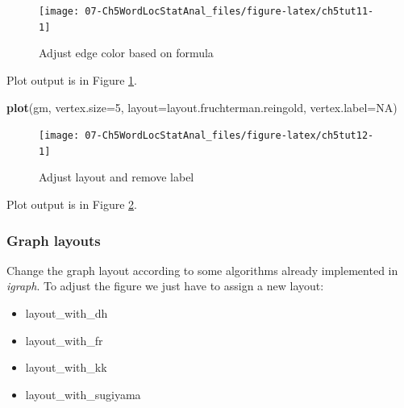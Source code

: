 \documentclass[
]{article}
\newenvironment{Shaded}{\begin{snugshade}}{\end{snugshade}}
\newcommand{\AttributeTok}[1]{\textcolor[rgb]{0.13,0.29,0.53}{#1}}
\newcommand{\ConstantTok}[1]{\textcolor[rgb]{0.56,0.35,0.01}{#1}}
\newcommand{\DecValTok}[1]{\textcolor[rgb]{0.00,0.00,0.81}{#1}}
\newcommand{\FloatTok}[1]{\textcolor[rgb]{0.00,0.00,0.81}{#1}}
\newcommand{\FunctionTok}[1]{\textcolor[rgb]{0.13,0.29,0.53}{\textbf{#1}}}
\newcommand{\NormalTok}[1]{#1}
\newcommand{\OtherTok}[1]{\textcolor[rgb]{0.56,0.35,0.01}{#1}}
\newcommand{\SpecialCharTok}[1]{\textcolor[rgb]{0.81,0.36,0.00}{\textbf{#1}}}
\newcommand{\StringTok}[1]{\textcolor[rgb]{0.31,0.60,0.02}{#1}}
\providecommand{\tightlist}{%
  \setlength{\itemsep}{0pt}\setlength{\parskip}{0pt}}
\begin{document}
\begin{figure}

{\centering \texttt{[image: 07-Ch5WordLocStatAnal\_files/figure-latex/ch5tut11-1]} 

}

\caption{Adjust edge color based on formula}\label{fig:ch5tut11}
\end{figure}

Plot output is in Figure \ref{fig:ch5tut11}.

\begin{Shaded}
\begin{Highlighting}[]
\FunctionTok{plot}\NormalTok{(gm, }\AttributeTok{vertex.size=}\DecValTok{5}\NormalTok{,}
     \AttributeTok{layout=}\NormalTok{layout.fruchterman.reingold,}
     \AttributeTok{vertex.label=}\ConstantTok{NA}\NormalTok{)}
\end{Highlighting}
\end{Shaded}

\begin{figure}

{\centering \texttt{[image: 07-Ch5WordLocStatAnal\_files/figure-latex/ch5tut12-1]} 

}

\caption{Adjust layout and remove label}\label{fig:ch5tut12}
\end{figure}

Plot output is in Figure \ref{fig:ch5tut12}.

\hypertarget{graph-layouts}{%
\subsubsection{Graph layouts}\label{graph-layouts}}

Change the graph layout according to some algorithms already implemented in \emph{igraph}. To adjust the figure we just have to assign a new layout:

\begin{itemize}
\tightlist
\item
  layout\_with\_dh
\item
  layout\_with\_fr
\item
  layout\_with\_kk
\item
  layout\_with\_sugiyama
\end{itemize}

\begin{Shaded}
\end{Shaded}
\end{document}
